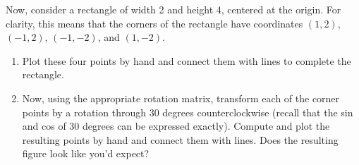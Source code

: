 \begin{prob}\label{ex:rotation}
Now, consider a rectangle of width 2 and height 4, centered at the origin. For clarity, this means that the corners of the rectangle have coordinates $(1,2)$, $(-1,2)$, $(-1,-2)$, and $(1,-2)$. 
\begin{enumerate}
\item Plot these four points by hand and connect them with lines to complete the rectangle.
\item Now, using the appropriate rotation matrix, transform each of the corner points by a rotation through 30 degrees counterclockwise (recall that the sin and cos of 30 degrees can be expressed exactly).  Compute and plot the resulting points by hand and connect them with lines.  Does the resulting figure look like you'd expect?
\end{enumerate}
\end{prob}
